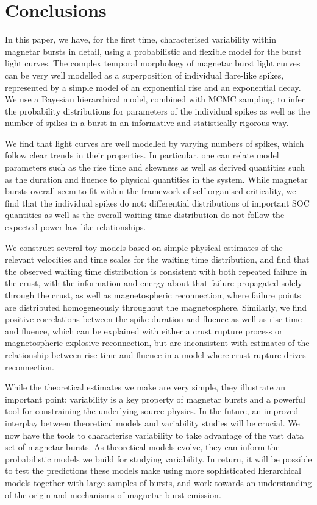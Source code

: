 \documentclass[12pt]{emulateapj}
\begin{document}
\section{Conclusions}

In this paper, we have, for the first time, characterised variability within magnetar bursts in detail, using a probabilistic and flexible model for the burst light curves.
The complex temporal morphology of magnetar burst light curves can be very well modelled as a superposition of individual flare-like spikes, represented by a simple
model of an exponential rise and an exponential decay. We use a Bayesian hierarchical model, combined with MCMC sampling, to infer the probability distributions for
parameters of the individual spikes as well as the number of spikes in a burst in an informative and statistically rigorous way. 

We find that light curves are well modelled by varying numbers of spikes, which follow clear trends in their properties. In particular, one can relate model parameters such as the 
rise time and skewness as well as derived quantities such as the duration and fluence to physical quantities in the system. 
While magnetar bursts overall seem to fit within the framework of self-organised criticality, we find that the individual spikes do not: differential distributions of important SOC 
quantities as well as the overall waiting time distribution do not follow the expected power law-like relationships.

We construct several toy models based on simple physical estimates of the relevant velocities and time scales for the waiting time distribution, and find that the observed waiting time distribution is 
consistent with both repeated failure in the crust, with the information and energy about that failure propagated solely through the crust, as well as magnetospheric reconnection, where
failure points are distributed homogeneously throughout the magnetosphere. Similarly, we find positive correlations between the spike duration and fluence as well as rise time and fluence, 
which can be explained with either a crust rupture process or magnetospheric explosive reconnection, but are inconsistent with estimates of the relationship between 
rise time and fluence in a model where crust rupture drives reconnection. 

While the theoretical estimates we make are very simple, they illustrate an important point: variability is a key property of magnetar bursts and a powerful tool for constraining the
underlying source physics. In the future, an improved interplay between theoretical models and variability studies will be crucial. We now have the tools to characterise 
variability to take advantage of 
the vast data set of magnetar bursts. As theoretical 
models evolve, they can inform the probabilistic models we build for studying variability. In return, it will be possible to test the predictions these models make using more sophisticated hierarchical models together with large samples of bursts,  and work towards an understanding of the origin and mechanisms of magnetar burst emission.
\end{document}
